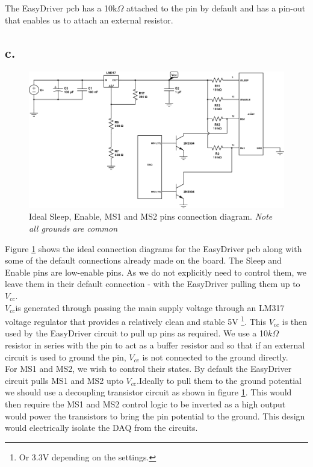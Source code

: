 \documentclass{article}
\theoremstyle{plain}
\theoremstyle{definition}
\theoremstyle{remark}
\begin{document}
The EasyDriver pcb has a 10k$\Omega$ attached to the pin by default and has a pin-out that enables us to attach an external resistor. 

\clearpage

\subsection*{c.}
\begin{figure}[htb]
\begin{center}
\includegraphics[width = 18cm]{lab5_q1_c.png}
\caption{Ideal Sleep, Enable, MS1 and MS2 pins connection diagram. \emph{Note all grounds are common}}
\label{q1_c}
\end{center}
\end{figure}

Figure \ref{q1_c} shows the ideal connection diagrams for the EasyDriver pcb along with some of the default connections already made on the board. The Sleep and Enable pins are low-enable pins. As we do not explicitly need to control them, we leave them in their default connection - with the EasyDriver pulling them up to $V_{cc}$.\\

$V_{cc}$is generated through passing the main supply voltage through an LM317 voltage regulator that provides a relatively clean and stable 5V \footnote{Or 3.3V depending on the settings.}. This $V_{cc}$ is then used by the EasyDriver circuit to pull up pins as required. We use a 10$k\Omega$ resistor in series with the pin to act as a buffer resistor and so that if an external circuit is used to ground the pin, $V_{cc}$ is not connected to the ground directly.\\

For MS1 and MS2, we wish to control their states. By default the EasyDriver circuit pulls MS1 and MS2 upto $V_{cc}$.Ideally to pull them to the ground potential we should use a decoupling transistor circuit as shown in figure \ref{q1_c}. This would then require the MS1 and MS2 control logic to be inverted as a high output would power the transistors to bring the pin potential to the ground. This design would electrically isolate the DAQ from the circuits.\\
\end{document}
